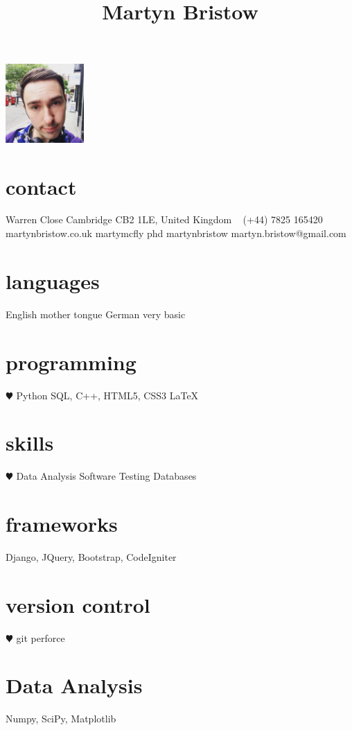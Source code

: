 \documentclass[]{cv-style}          %
\begin{document}
\lastupdated
\title{Martyn Bristow}


\begin{aside}
%
\includegraphics[width=3cm]{martyn.jpg}
\section{contact}
 Warren Close
\hspace*{25pt} Cambridge
\hspace*{25pt} CB2 1LE, 
\hspace*{25pt} United Kingdom
~
\faPhone (+44) 7825 165420
~
{\faGlobe martynbristow.co.uk}
{\faTwitter martymcfly phd}
{\faGithub martynbristow}
{\faEnvelope martyn.bristow@gmail.com}
\section{languages}
English mother tongue
German very basic
%
\section{programming}
{\color{red} $\varheartsuit$} Python
SQL, C++,
HTML5, CSS3
\LaTeX{}
\section{skills}
{\color{red} $\varheartsuit$} Data Analysis
Software Testing
Databases
\section{frameworks}
Django, JQuery, Bootstrap, CodeIgniter
\section{version control}
{\color{red} $\varheartsuit$} git
perforce
\section{Data Analysis}
Numpy, SciPy, Matplotlib
\end{aside}
\end{document}
